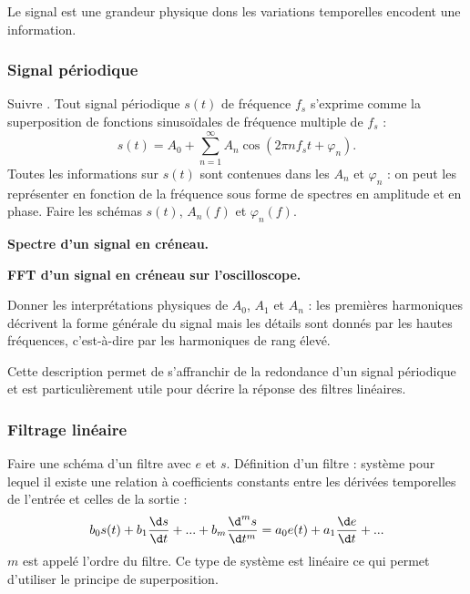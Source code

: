Le signal est une grandeur physique dons les variations temporelles encodent une information.

\subsubsection{Signal périodique}

Suivre \cite{Salamito2017}.
Tout signal périodique $s(t)$ de fréquence $f_s$ s'exprime comme la superposition de fonctions sinusoïdales de fréquence multiple de $f_s$ :
\begin{equation}
s(t) = A_0 + \sum_{n=1}^\infty A_n \cos(2\pi n f_s t + \varphi_n).
\end{equation}
Toutes les informations sur $s(t)$ sont contenues dans les $A_n$ et $\varphi_n$ : on peut les représenter en fonction de la fréquence sous forme de spectres en amplitude et en phase.
Faire les schémas $s(t)$, $A_n(f)$ et $\varphi_n(f)$.

\begin{slide}
\textbf{Spectre d'un signal en créneau.}
\end{slide}

\begin{experience}
\textbf{FFT d'un signal en créneau sur l'oscilloscope.}
\end{experience}

Donner les interprétations physiques de $A_0$, $A_1$ et $A_n$ : les premières harmoniques décrivent la forme générale du signal mais les détails sont donnés par les hautes fréquences, c'est-à-dire par les harmoniques de rang élevé.

\begin{transition}
Cette description permet de s'affranchir de la redondance d'un signal périodique et est particulièrement utile pour décrire la réponse des filtres linéaires.
\end{transition}

\subsubsection{Filtrage linéaire}

Faire une schéma d'un filtre avec $e$ et $s$.
Définition d'un filtre : système pour lequel il existe une relation à coefficients constants entre les dérivées temporelles de l'entrée et celles de la sortie :
\begin{equation}
b_0 s(t) + b_1 \frac{\d s}{\d t} + ... + b_m \frac{\d^m s}{\d t^m} = a_0 e(t) + a_1 \frac{\d e}{\d t}+ ...
\end{equation}
$m$ est appelé l'ordre du filtre.
Ce type de système est linéaire ce qui permet d'utiliser le principe de superposition.

